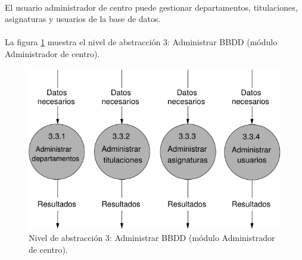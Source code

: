 \paragraph{}El usuario administrador de centro puede gestionar departamentos,
titulaciones, asignaturas y usuarios de la base de datos.

\paragraph{}La figura \ref{diagramaNivel3-AdministrarBBDD-adminCentro} muestra
el nivel de abstracción 3: Administrar BBDD (módulo Administrador de centro).

  \begin{figure}[!ht]
    \begin{center}
      \includegraphics[]{08.Analisis_Funcional/8.2.DFDs/Niveles/Nivel3/AdministradorCentro/AdministrarBBDD/Diagramas/nivel3-AdministrarBBDD.pdf}
      \caption{Nivel de abstracción 3: Administrar BBDD (módulo Administrador
      de centro).}
      \label{diagramaNivel3-AdministrarBBDD-adminCentro}
    \end{center}
  \end{figure}

